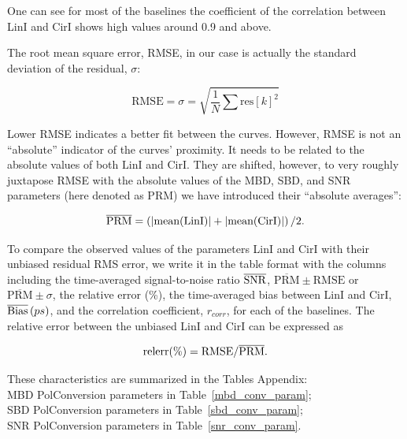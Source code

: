 \documentclass[letterpaper,twoside,12pt]{article}
\begin{document}
One can see for most of the baselines the coefficient of the correlation between LinI and CirI shows high values around 0.9 and above.

The root mean square error, RMSE, in our case is actually the standard deviation of the residual, $\sigma$:

\begin{equation}
  \label{rmse}
  \mathrm{RMSE} = \sigma = \sqrt{\frac{1}{N} \sum \mathrm{res}[k]^2}
\end{equation}

Lower RMSE indicates a better fit between the curves. However, RMSE is not an ``absolute'' indicator of the curves' proximity. It needs to be related to the absolute values of both $\mathrm{LinI}$ and $\mathrm{CirI}$. They are shifted, however, to very roughly juxtapose RMSE with the absolute values of the MBD, SBD, and SNR parameters (here denoted as PRM) we have introduced their ``absolute averages'':

\begin{equation}
  \label{abs_avg}
  \overline{\mathrm{PRM}} = \left( \rm |mean(LinI)| + |mean(CirI)| \right)/2.
\end{equation}

To compare the observed values of the parameters LinI and CirI with their unbiased residual RMS error, we write it in the table format with the columns including the time-averaged signal-to-noise ratio $\overline{\rm{SNR}}$, $\overline{\mathrm{PRM}} \pm \mathrm{RMSE}$ or $\overline{\mathrm{PRM}} \pm \sigma$, the relative error (\%), the time-averaged bias between LinI and CirI, $\overline{\rm{Bias}}\, (ps)$, and the correlation coefficient, $r_{corr}$, for each of the baselines. The relative error between the unbiased LinI and CirI can be expressed as

\begin{equation}
  \label{rel_err}
  \rm relerr (\%) = RMSE / \overline{\mathrm{PRM}}.
\end{equation}

These characteristics are summarized in the Tables Appendix: \\

\noindent MBD PolConversion parameters in Table~\ref{mbd_conv_param}; \\
\noindent SBD PolConversion parameters in Table~\ref{sbd_conv_param}; \\
\noindent SNR PolConversion parameters in Table~\ref{snr_conv_param}. \\
\end{document}

